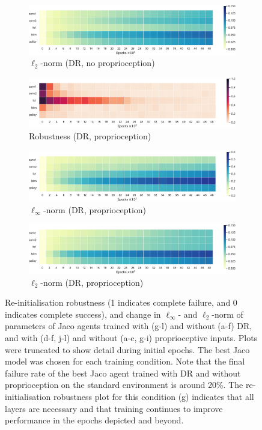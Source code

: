 \begin{figure}
\begin{subfigure}{0.32\textwidth}
    \includegraphics[width=\textwidth]{figures/chapter6/robustness/jaco/visual_random/l2_dist}
    \caption{$\ell_2$-norm (DR, no proprioception)}
  \end{subfigure}
  \begin{subfigure}{0.32\textwidth}
    \includegraphics[width=\textwidth]{figures/chapter6/robustness/jaco/sensor_random/error}
    \caption{Robustness (DR, proprioception)}
  \end{subfigure}
  \begin{subfigure}{0.32\textwidth}
    \includegraphics[width=\textwidth]{figures/chapter6/robustness/jaco/sensor_random/inf_dist}
    \caption{$\ell_\infty$-norm (DR, proprioception)}
  \end{subfigure}
  \begin{subfigure}{0.32\textwidth}
    \includegraphics[width=\textwidth]{figures/chapter6/robustness/jaco/sensor_random/l2_dist}
    \caption{$\ell_2$-norm (DR, proprioception)}
  \end{subfigure}
  \caption{Re-initialisation robustness (1 indicates complete failure, and 0 indicates complete success), and change in $\ell_\infty$- and $\ell_2$-norm of parameters of Jaco agents trained with (g-l) and without (a-f) DR, and with (d-f, j-l) and without (a-c, g-i) proprioceptive inputs. Plots were truncated to show detail during initial epochs. The best Jaco model was chosen for each training condition. Note that the final failure rate of the best Jaco agent trained with DR and without proprioception on the standard environment is around 20\%. The re-initialisation robustness plot for this condition (g) indicates that all layers are necessary and that training continues to improve performance in the epochs depicted and beyond.}
  \label{fig:jaco_robustness}
\end{figure}

